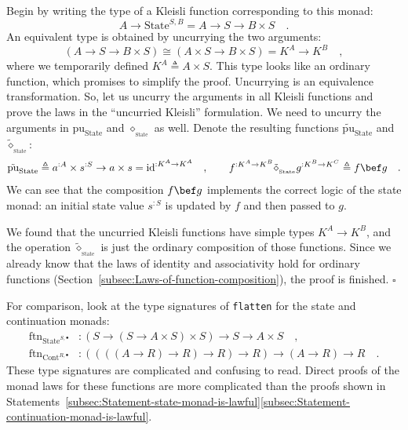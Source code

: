 Begin by writing the type of a Kleisli function corresponding to this
monad:
\[
A\rightarrow\text{State}^{S,B}=A\rightarrow S\rightarrow B\times S\quad.
\]
An equivalent type is obtained by uncurrying the two arguments:
\[
\left(A\rightarrow S\rightarrow B\times S\right)\cong\left(A\times S\rightarrow B\times S\right)=K^{A}\rightarrow K^{B}\quad,
\]
where we temporarily defined $K^{A}\triangleq A\times S$. This type
looks like an ordinary function, which promises to simplify the proof.
Uncurrying is an equivalence transformation. So, let us uncurry the
arguments in all Kleisli functions and prove the laws in the \textsf{``}uncurried
Kleisli\textsf{''} formulation. We need to uncurry the arguments in $\text{pu}_{\text{State}}$
and $\diamond_{_{\text{State}}}$ as well. Denote the resulting functions
$\tilde{\text{pu}}_{\text{State}}$ and $\tilde{\diamond}_{_{\text{State}}}$:
\[
\tilde{\text{pu}}_{\text{State}}\triangleq a^{:A}\times s^{:S}\rightarrow a\times s=\text{id}^{:K^{A}\rightarrow K^{A}}\quad,\quad\quad f^{:K^{A}\rightarrow K^{B}}\tilde{\diamond}_{_{\text{State}}}g^{:K^{B}\rightarrow K^{C}}\triangleq f\bef g\quad.
\]
We can see that the composition $f\bef g$ implements the correct
logic of the state monad: an initial state value $s^{:S}$ is updated
by $f$ and then passed to $g$.

We found that the uncurried Kleisli functions have simple types $K^{A}\rightarrow K^{B}$,
and the operation $\tilde{\diamond}_{_{\text{State}}}$ is just the
ordinary composition of those functions. Since we already know that
the laws of identity and associativity hold for ordinary functions
(Section~\ref{subsec:Laws-of-function-composition}), the proof is
finished. $\square$

For comparison, look at the type signatures of \lstinline!flatten!
for the state and continuation monads:
\begin{align*}
\text{ftn}_{\text{State}^{S,\bullet}} & :\left(S\rightarrow\left(S\rightarrow A\times S\right)\times S\right)\rightarrow S\rightarrow A\times S\quad,\\
\text{ftn}_{\text{Cont}^{R,\bullet}} & :\left(\left(\left(\left(A\rightarrow R\right)\rightarrow R\right)\rightarrow R\right)\rightarrow R\right)\rightarrow\left(A\rightarrow R\right)\rightarrow R\quad.
\end{align*}
These type signatures are complicated and confusing to read. Direct
proofs of the monad laws for these functions are more complicated
than the proofs shown in Statements~\ref{subsec:Statement-state-monad-is-lawful}\textendash \ref{subsec:Statement-continuation-monad-is-lawful}. 

